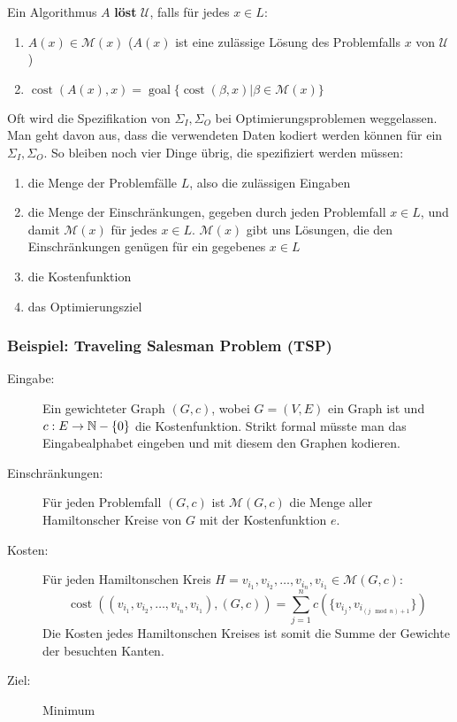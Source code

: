 \begin{definition}
Ein Algorithmus $A$ \textbf{löst} $\mathcal{U}$, falls für jedes $x \in L$:
\begin{enumerate}
  \item $A(x) \in \mathcal{M}(x)$ ($A(x)$ ist eine zulässige Lösung des Problemfalls $x$ von $\mathcal{U}$)
  \item $\operatorname{cost}(A(x), x) = \operatorname{goal}\{\operatorname{cost}(\beta, x) | \beta \in \mathcal{M}(x)\}$
\end{enumerate}

\end{definition}

\begin{remark}
Oft wird die Spezifikation von $\Sigma_I, \Sigma_O$ bei Optimierungsproblemen weggelassen. Man geht davon aus, dass die verwendeten Daten kodiert werden können für ein $\Sigma_I, \Sigma_O$. So bleiben noch vier Dinge übrig, die spezifiziert werden müssen:
\begin{enumerate}
  \item die Menge der Problemfälle $L$, also die zulässigen Eingaben
  \item die Menge der Einschränkungen, gegeben durch jeden Problemfall $x \in L$, und damit $\mathcal{M}(x)$ für jedes $x \in L$. $\mathcal{M}(x)$ gibt uns Lösungen, die den Einschränkungen genügen für ein gegebenes $x \in L$
  \item die Kostenfunktion
  \item das Optimierungsziel
\end{enumerate}

\end{remark}

\subsubsection{Beispiel: Traveling Salesman Problem (TSP)}
\begin{description}
  \item[Eingabe:] Ein gewichteter Graph $(G, c)$, wobei $G = (V, E)$ ein Graph ist und $c: E \to \mathbb{N} - \{0\}$ die Kostenfunktion. Strikt formal müsste man das Eingabealphabet eingeben und mit diesem den Graphen kodieren.
  \item[Einschränkungen:] Für jeden Problemfall $(G, c)$ ist $\mathcal{M}(G, c)$ die Menge aller Hamiltonscher Kreise von $G$ mit der Kostenfunktion $e$.
  \item[Kosten:] Für jeden Hamiltonschen Kreis $H = v_{i_1}, v_{i_2}, \ldots, v_{i_n}, v_{i_1} \in \mathcal{M}(G, c)$:
    \[
    \operatorname{cost}((v_{i_1}, v_{i_2}, \ldots, v_{i_n}, v_{i_1}), (G, c)) = \sum_{j = 1}^n c \left (\{v_{i_j}, v_{i_{(j \mod n) + 1}}\} \right )
    \]
    Die Kosten jedes Hamiltonschen Kreises ist somit die Summe der Gewichte der besuchten Kanten.
  \item[Ziel:] Minimum\\
\end{description}

